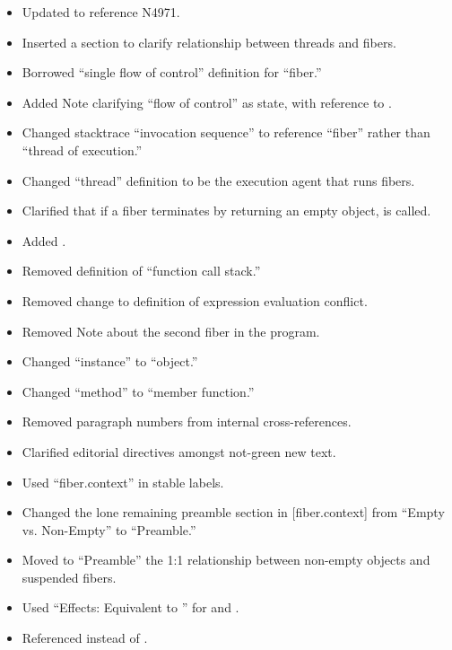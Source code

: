 \begin{itemize}
    \item Updated to reference N4971.
    \item Inserted a section to clarify relationship between threads and fibers.
    \item Borrowed ``single flow of control'' definition for ``fiber.''
    \item Added Note clarifying ``flow of control'' as state, with reference
    to .
    \item Changed stacktrace ``invocation sequence'' to reference ``fiber'' rather
    than ``thread of execution.''
    \item Changed ``thread'' definition to be the execution agent that runs fibers.
    \item Clarified that if a fiber terminates by returning an empty \fiber
          object,  is called.
    \item Added .
    \item Removed definition of ``function call stack.''
    \item Removed change to definition of expression evaluation conflict.
    \item Removed Note about the second fiber in the program.
    \item Changed ``\fiber instance'' to ``\fiber object.''
    \item Changed ``method'' to ``member function.''
    \item Removed paragraph numbers from internal cross-references.
    \item Clarified editorial directives amongst not-green new text.
    \item Used ``fiber.context'' in stable labels.
    \item Changed the lone remaining preamble section in [fiber.context] from
    ``Empty vs. Non-Empty'' to ``Preamble.''
    \item Moved to ``Preamble'' the 1:1 relationship between non-empty \fiber
    objects and suspended fibers.
    \item Used ``Effects: Equivalent to '' for
     and .
    \item Referenced \justmain instead of \main.
\end{itemize}


